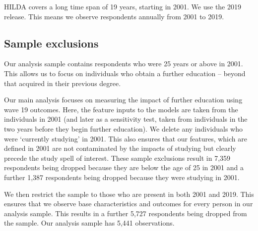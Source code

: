 \documentclass[12pt, a4paper]{article}
\begin{document}
HILDA covers a long time span of 19 years, starting in 2001. We use the 2019 release. This means we observe respondents annually from 2001 to 2019.

\subsection{Sample exclusions}

Our analysis sample contains respondents who were 25 years or above in 2001. This allows us to focus on individuals who obtain a further education – beyond that acquired in their previous degree. 

Our main analysis focuses on measuring the impact of further education using
wave 19 outcomes. Here, the feature inputs to the models are taken from the
individuals in 2001 (and later as a sensitivity test, taken from individuals in the two years before they begin further education). We delete any individuals who were ‘currently studying’ in
2001. This also ensures that our features, which are defined in 2001 are not
contaminated by the impacts of studying but clearly precede the study spell of
interest. These sample exclusions result in 7,359 respondents being dropped
because they are below the age of 25 in 2001 and a further 1,387 respondents
being dropped because they were studying in 2001.

We then restrict the sample to those who are present in both 2001 and 2019. This ensures that we observe base characteristics and outcomes for every person in our analysis sample. This results in a further 5,727 respondents being dropped from the sample. Our analysis sample has 5,441 observations.


%
\end{document}
